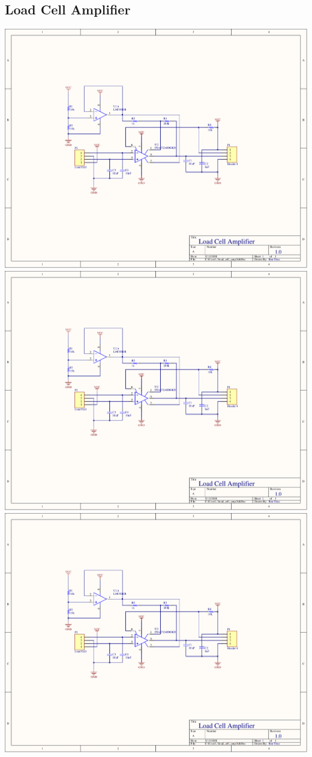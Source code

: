 \begin{flushleft}
\section{Load Cell Amplifier}
\end{flushleft}
\label{app:load_cell_amp}
\centering
\includegraphics[page=1,width=\textwidth,angle=270]{PDFs/load_cell_amp.PDF} \newpage
\includegraphics[page=2,width=\textwidth,angle=270]{PDFs/load_cell_amp.PDF} \newpage
\includegraphics[page=3,width=\textwidth,angle=270]{PDFs/load_cell_amp.PDF} \newpage